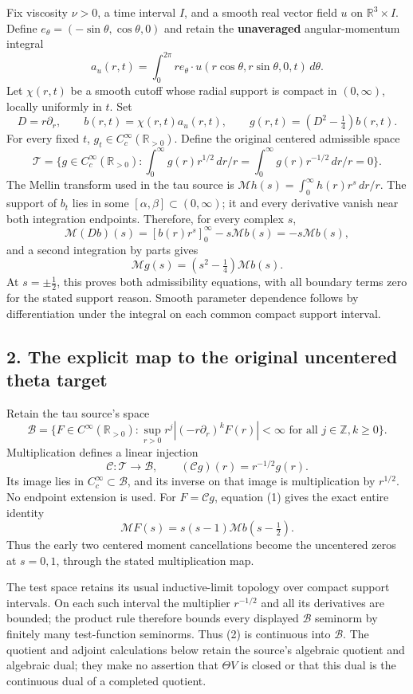 Fix viscosity \(\nu>0\), a time interval \(I\), and a smooth real vector
field \(u\) on \(\mathbb R^3\times I\). Define
\(e_\theta=(-\sin\theta,\cos\theta,0)\) and retain the
\textbf{unaveraged} angular-momentum integral \[
a_u(r,t)=\int_0^{2\pi}r e_\theta\cdot u(r\cos\theta,r\sin\theta,0,t)\,d\theta.
\] Let \(\chi(r,t)\) be a smooth cutoff whose radial support is compact
in \((0,\infty)\), locally uniformly in \(t\). Set \[
D=r\partial_r,\qquad b(r,t)=\chi(r,t)a_u(r,t),\qquad
g(r,t)=(D^2-\tfrac14)b(r,t).
\] For every fixed \(t\), \(g_t\in C_c^\infty(\mathbb R_{>0})\). Define
the original centered admissible space \[
\mathscr T=\{g\in C_c^\infty(\mathbb R_{>0}):\int_0^\infty g(r)r^{1/2}\,dr/r=\int_0^\infty g(r)r^{-1/2}\,dr/r=0\}.
\] The Mellin transform used in the tau source is
\(\mathcal M h(s)=\int_0^\infty h(r)r^s\,dr/r\). The support of \(b_t\)
lies in some \([\alpha,\beta]\subset(0,\infty)\); it and every
derivative vanish near both integration endpoints. Therefore, for every
complex \(s\), \[
\mathcal M(Db)(s)=[b(r)r^s]_0^\infty-s\mathcal Mb(s)=-s\mathcal Mb(s),
\] and a second integration by parts gives \[
\mathcal Mg(s)=(s^2-\tfrac14)\mathcal Mb(s).
\tag{1}
\] At \(s=\pm\tfrac12\), this proves both admissibility equations, with
all boundary terms zero for the stated support reason. Smooth parameter
dependence follows by differentiation under the integral on each common
compact support interval.

\subsection{2. The explicit map to the original uncentered theta
target}\label{TranscriptStage:proof09:the-explicit-map-to-the-original-uncentered-theta-target}

Retain the tau source's space \[
\mathscr B=\{F\in C^\infty(\mathbb R_{>0}):\sup_{r>0}r^j|(-r\partial_r)^kF(r)|<\infty\text{ for all }j\in\mathbb Z,k\ge0\}.
\] Multiplication defines a linear injection \[
\mathcal C:\mathscr T\longrightarrow\mathscr B,\qquad (\mathcal Cg)(r)=r^{-1/2}g(r).
\tag{2}
\] Its image lies in \(C_c^\infty\subset\mathscr B\), and its inverse on
that image is multiplication by \(r^{1/2}\). No endpoint extension is
used. For \(F=\mathcal Cg\), equation (1) gives the exact entire
identity \[
\boxed{\mathcal MF(s)=s(s-1)\mathcal Mb(s-\tfrac12).}
\tag{3}
\] Thus the early two centered moment cancellations become the
uncentered zeros at \(s=0,1\), through the stated multiplication map.

The test space retains its usual inductive-limit topology over compact
support intervals. On each such interval the multiplier \(r^{-1/2}\) and
all its derivatives are bounded; the product rule therefore bounds every
displayed \(\mathscr B\) seminorm by finitely many test-function
seminorms. Thus (2) is continuous into \(\mathscr B\). The quotient and
adjoint calculations below retain the source's algebraic quotient and
algebraic dual; they make no assertion that \(\Theta V\) is closed or
that this dual is the continuous dual of a completed quotient.

